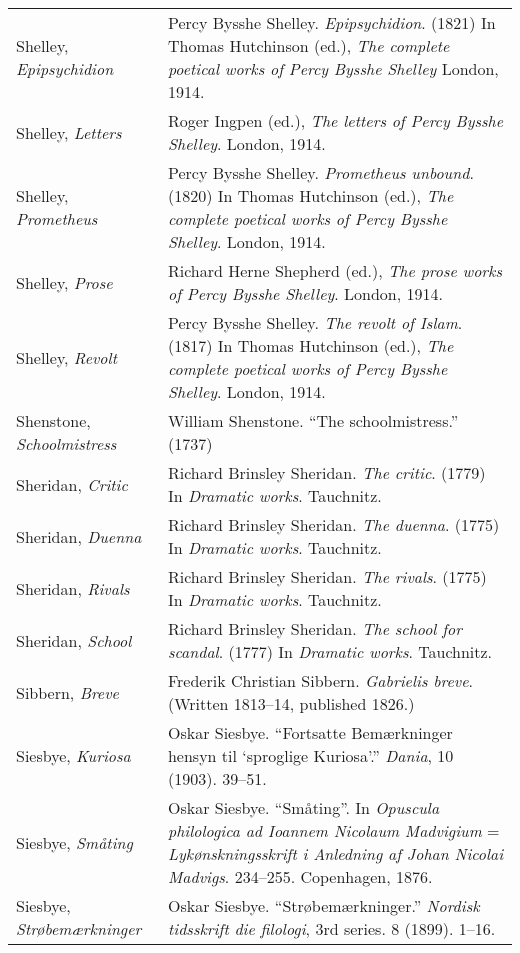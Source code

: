 \begin{longtable}{p{} p{}}
Shelley, \textit{Epipsychidion} & Percy Bysshe Shelley. \textit{Epipsychidion}. (1821) In Thomas Hutchinson (ed.), \textit{The complete poetical works of Percy Bysshe Shelley} London, 1914. \\
Shelley, \textit{Letters} & Roger Ingpen (ed.), \textit{The letters of Percy Bysshe Shelley}. London, 1914. \\
Shelley, \textit{Prometheus} & Percy Bysshe Shelley. \textit{Prometheus unbound}. (1820) In Thomas Hutchinson (ed.), \textit{The complete poetical works of Percy Bysshe Shelley}. London, 1914.  \\
Shelley, \textit{Prose} & Richard Herne Shepherd (ed.), \textit{The prose works of Percy Bysshe Shelley}. London, 1914. \\ %
Shelley, \textit{Revolt} & Percy Bysshe Shelley. \textit{The revolt of Islam}. (1817) In Thomas Hutchinson (ed.), \textit{The complete poetical works of Percy Bysshe Shelley}. London, 1914. \\

Shenstone, \textit{Schoolmistress} & William Shenstone. ``The schoolmistress.'' (1737) \\

Sheridan, \textit{Critic} & Richard Brinsley Sheridan. \textit{The critic}. (1779) In \textit{Dramatic works}. Tauchnitz. \\ 
Sheridan, \textit{Duenna} & Richard Brinsley Sheridan. \textit{The duenna}. (1775) In \textit{Dramatic works}. Tauchnitz. \\ %
Sheridan, \textit{Rivals} & Richard Brinsley Sheridan. \textit{The rivals}. (1775) In \textit{Dramatic works}. Tauchnitz. \\
Sheridan, \textit{School} & Richard Brinsley Sheridan. \textit{The school for scandal}. (1777) In \textit{Dramatic works}. Tauchnitz. \\

Sibbern, \textit{Breve} & Frederik Christian Sibbern. \textit{Gabrielis breve}. (Written 1813--14, published 1826.) \\

Siesbye, \textit{Kuriosa} & Oskar Siesbye. ``Fortsatte Bemærkninger hensyn til `sproglige Kuriosa'.'' \textit{Dania}, 10 (1903). 39--51. \\
Siesbye, \textit{Småting} & Oskar Siesbye. ``Småting''. In \textit{Opuscula philologica ad Ioannem Nicolaum Madvigium} = \textit{Lykønskningsskrift i Anledning af Johan Nicolai Madvigs}. 234--255. Copenhagen, 1876. \\ %
\raggedright{Siesbye, \textit{Strøbemærkninger}} & Oskar Siesbye. ``Strøbemærkninger.'' \textit{Nordisk tidsskrift die filologi}, 3rd series. 8 (1899). 1--16. \\


\end{longtable}

